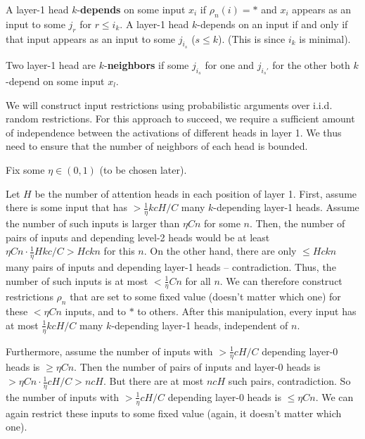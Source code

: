 \documentclass[11pt,a4paper]{article}
\begin{document}
A layer-1 head $k$-\textbf{depends} on some input $x_i$ if $\rho_n(i) = *$ and $x_i$ appears as an input to some $j_r$ for $r \leq i_k$.
A layer-1 head $k$-depends on an input if and only if that input appears as an input to some $j_{i_s}$ ($s \leq k$). (This is since $i_k$ is minimal).

Two layer-1 head are $k$-\textbf{neighbors} if some $j_{i_s}$ for one and $j_{i_s'}$ for the other both $k$-depend on some input $x_l$.



We will construct input restrictions using probabilistic arguments over i.i.d. random restrictions.
For this approach to succeed, we require a  sufficient amount of independence between the activations of different heads in layer 1.
We thus need to ensure that the number of neighbors of each head is bounded.

Fix some $\eta \in (0,1)$ (to be chosen later).

Let $H$ be the number of attention heads in each position of layer 1.
First, assume there is some input that has $>\frac{1}{\eta}kcH/C$ many $k$-depending layer-1 heads.
Assume the number of such inputs is larger than $\eta Cn$ for some $n$.
Then, the number of pairs of inputs and depending level-2 heads would be at least $\eta C n \cdot \frac{1}{\eta} H k c/C > Hckn$ for this $n$.
On the other hand, there are only $\leq Hckn$ many pairs of inputs and depending layer-1 heads -- contradiction.
Thus, the number of such inputs is at most $<\frac{1}{\eta}Cn$ for all $n$.
We can therefore construct restrictions $\rho_n$ that are set to some fixed value (doesn't matter which one) for these $<\eta Cn$ inputs, and to $*$ to others.
After this manipulation, every input has at most $\frac{1}{\eta}kcH/C$ many $k$-depending layer-1 heads, independent of $n$. 

Furthermore, assume the number of inputs with $> \frac{1}{\eta} cH/C$ depending layer-0 heads is $\geq \eta Cn$.
Then the number of pairs of inputs and layer-0 heads is $>\eta Cn \cdot \frac{1}{\eta} cH/C > ncH$.
But there are at most $ncH$ such pairs, contradiction.
So the number of inputs with $> \frac{1}{\eta} cH/C$ depending layer-0 heads is $\leq \eta Cn$.
We can again restrict these inputs to some fixed value (again, it doesn't matter which one).
\end{document}
